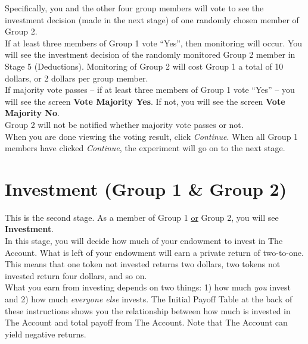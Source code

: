 \documentclass[12pt]{article}
\begin{document}
Specifically, you and the other four group members will vote to see the investment decision (made in the next stage) of one randomly chosen member of Group 2.\\ 
 
If at least three members of Group 1 vote ``Yes'', then monitoring will occur.  You will see the investment decision of the randomly monitored Group 2 member in Stage 5 (Deductions).  Monitoring of Group 2 will cost Group 1 a total of 10 dollars, or 2 dollars per group member.\\ 
 
If majority vote passes -- if at least three members of Group 1 vote ``Yes'' -- you will see the screen {\bf Vote Majority Yes}.  If not, you will see the screen {\bf Vote Majority No}.\\ 

Group 2 will not be notified whether majority vote passes or not.\\ 

When you are done viewing the voting result, click {\em Continue}. When all Group 1 members have clicked {\em Continue}, the experiment will go on to the next stage.\\ 

\newpage

\fi


\section{Investment (Group 1 \& Group 2)}

This is the second stage. As a member of Group 1 \underline{or} Group 2, you will see {\bf Investment}.\\

In this stage, you will decide how much of your endowment to invest in The Account. What is left of your endowment will earn a private return of two-to-one. This means that one token not invested returns two dollars, two tokens not invested return four dollars, and so on.\\ 

What you earn from investing depends on two things: 1) how much {\em you} invest and 2) how much {\em everyone else} invests.  The Initial Payoff Table at the back of these instructions shows you the relationship between how much is invested in The Account and total payoff from The Account. Note that The Account can yield negative returns.\\ 
\end{document}
